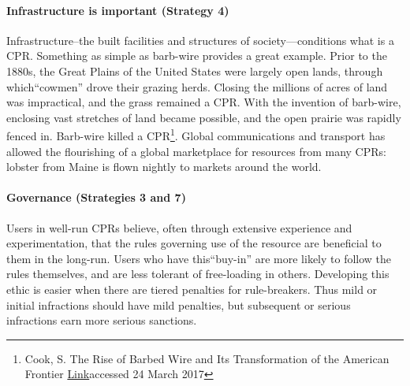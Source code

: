 \paragraph{Infrastructure is important (Strategy 4)}
Infrastructure--the built facilities and structures of society---conditions what is a CPR. Something as simple as barb-wire provides a great example. Prior to the 1880s, the Great Plains of the United States were largely open lands, through which``cowmen'' drove their grazing herds. Closing the millions of acres of land was impractical, and the grass remained a CPR. With the invention of barb-wire, enclosing vast stretches of land became possible, and the open prairie was rapidly fenced in. Barb-wire killed a CPR\footnote{Cook, S. The Rise of Barbed Wire and Its Transformation of the American Frontier \href{http://xroads.virginia.edu/~class/am485_98/cook/develp2.htm}{Link}accessed 24 March 2017}. Global communications and transport has allowed the flourishing of a global marketplace for resources from many CPRs: lobster from Maine is flown nightly to markets around the world.\\

\paragraph{Governance (Strategies 3 and 7)}
Users in well-run CPRs believe, often through extensive experience and experimentation, that the rules governing use of the resource are beneficial to them in the long-run. Users who have this``buy-in'' are more likely to follow the rules themselves, and are less tolerant of free-loading in others. Developing this ethic is easier when there are tiered penalties for rule-breakers. Thus mild or initial infractions should have mild penalties, but subsequent or serious infractions earn more serious sanctions.\\

